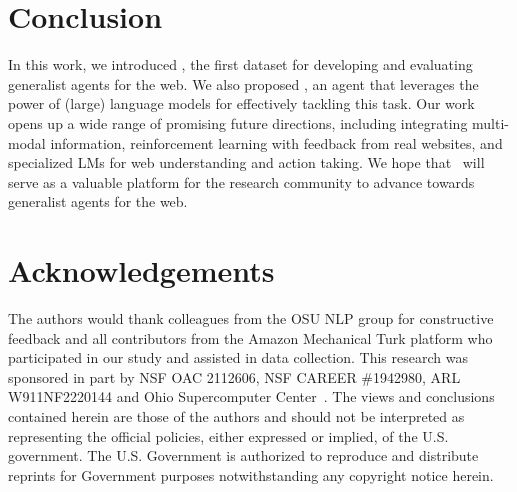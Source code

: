 \section{Conclusion}

In this work, we introduced \mind, the first dataset for developing and evaluating generalist agents for the web. 
We also proposed \model, an agent that leverages the power of (large) language models for effectively tackling this task. 
Our work opens up a wide range of promising future directions, including integrating multi-modal information, reinforcement learning with feedback from real websites, and specialized LMs for web understanding and action taking.
We hope that \mind\ will serve as a valuable platform for the research community to advance towards generalist agents for the web.

\section*{Acknowledgements}
The authors would thank colleagues from the OSU NLP group for constructive feedback and all contributors from the Amazon Mechanical Turk platform who participated in our study and assisted in data collection. 
This research was sponsored in part by NSF OAC 2112606, NSF CAREER \#1942980, ARL W911NF2220144 and Ohio Supercomputer Center~\cite{OhioSupercomputerCenter1987}. The views and conclusions contained herein are those of the authors and should not be interpreted as representing the official policies,
either expressed or implied, of the U.S. government. The U.S. Government is authorized to reproduce and distribute reprints for Government purposes notwithstanding any copyright notice herein.